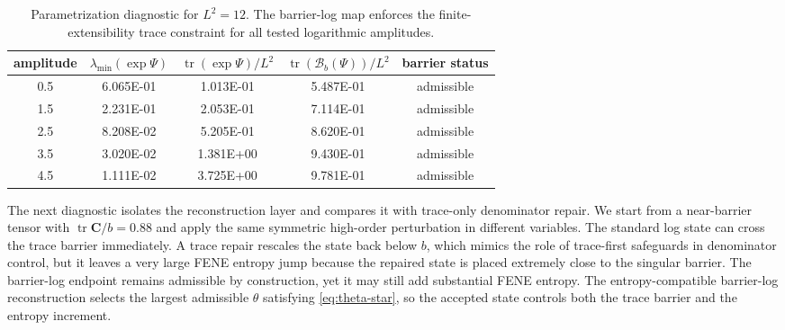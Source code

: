 ﻿\documentclass[11pt]{amsart}
\newcommand{\CC}{\bm C}
\newcommand{\tr}{\operatorname{tr}}
\begin{document}
\begin{table}[htbp]
\centering
\caption{Parametrization diagnostic for $L^2=12$.  The barrier-log map enforces the finite-extensibility trace constraint for all tested logarithmic amplitudes.}
\label{tab:barrier-map}
\begin{tabular}{ccccc}
\toprule
amplitude & $\lambda_{\min}(\exp\Psi)$ & $\tr(\exp\Psi)/L^2$ & $\tr(\mathcal B_b(\Psi))/L^2$ & barrier status \\
\midrule
0.5 & 6.065E-01 & 1.013E-01 & 5.487E-01 & admissible \\
1.5 & 2.231E-01 & 2.053E-01 & 7.114E-01 & admissible \\
2.5 & 8.208E-02 & 5.205E-01 & 8.620E-01 & admissible \\
3.5 & 3.020E-02 & 1.381E+00 & 9.430E-01 & admissible \\
4.5 & 1.111E-02 & 3.725E+00 & 9.781E-01 & admissible \\
\bottomrule
\end{tabular}
\end{table}

The next diagnostic isolates the reconstruction layer and compares it with trace-only denominator repair.  We start from a near-barrier tensor with $\tr\CC/b=0.88$ and apply the same symmetric high-order perturbation in different variables.  The standard log state can cross the trace barrier immediately.  A trace repair rescales the state back below $b$, which mimics the role of trace-first safeguards in denominator control, but it leaves a very large FENE entropy jump because the repaired state is placed extremely close to the singular barrier.  The barrier-log endpoint remains admissible by construction, yet it may still add substantial FENE entropy.  The entropy-compatible barrier-log reconstruction selects the largest admissible $\theta$ satisfying \eqref{eq:theta-star}, so the accepted state controls both the trace barrier and the entropy increment.
\end{document}

